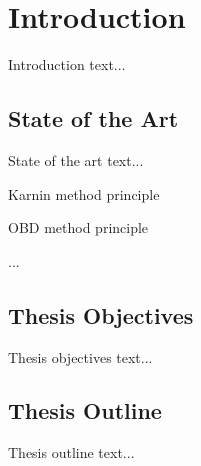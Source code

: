 \chapter{Introduction} \label{chap:introduction}
Introduction text...

\newpage
\section{State of the Art} \label{sec:state_of_the_art}
State of the art text...  \citep{article:pruning_algorithms}

Karnin method principle

OBD method principle

\newpage
...
\newpage
\section{Thesis Objectives} \label{sec:thesis_objectives}
Thesis objectives text...

\section{Thesis Outline} \label{sec:thesis_outline}
Thesis outline text...